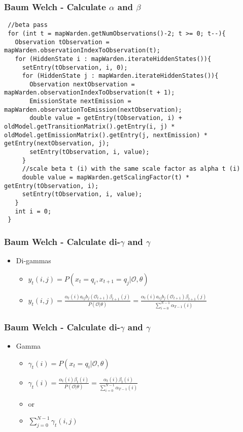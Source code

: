 \begin{frame}[fragile]
	\frametitle{Baum Welch - Calculate $\alpha$ and $\beta$}
	\begin{lstlisting}
 //beta pass
 for (int t = mapWarden.getNumObservations()-2; t >= 0; t--){
   Observation tObservation = mapWarden.observationIndexToObservation(t);
   for (HiddenState i : mapWarden.iterateHiddenStates()){
     setEntry(tObservation, i, 0);
     for (HiddenState j : mapWarden.iterateHiddenStates()){
       Observation nextObservation = mapWarden.observationIndexToObservation(t + 1);
       EmissionState nextEmission = mapWarden.observationToEmission(nextObservation);
       double value = getEntry(tObservation, i) + oldModel.getTransitionMatrix().getEntry(i, j) * oldModel.getEmissionMatrix().getEntry(j, nextEmission) * getEntry(nextObservation, j);
       setEntry(tObservation, i, value);
     }
     //scale beta t (i) with the same scale factor as alpha t (i)
     double value = mapWarden.getScalingFactor(t) * getEntry(tObservation, i);
     setEntry(tObservation, i, value);
   }
   int i = 0;
 }
	\end{lstlisting}
\end{frame}

\begin{frame}
	\frametitle{Baum Welch - Calculate di-$\gamma$ and $\gamma$}
	\begin{itemize}
		\item Di-gammas
		\begin{itemize}
			\item $y_t(i,j) = P(x_t = q_i, x_{t+1} = q_j | \mathcal{O},\theta)$
			\item $y_t(i,j) = \frac{\alpha_t(i) a_{ij} b_j (\mathcal{O}_{t+1})\beta_{t+1}(j)}{P(\mathcal{O} | \theta)} = \frac{\alpha_t(i) a_{ij} b_j (\mathcal{O}_{t+1})\beta_{t+1}(j)}{\sum\limits_{i=0}^{N-1} \alpha_{T-1}(i)}$
		\end{itemize}
	\end{itemize}
\end{frame}

\begin{frame}
	\frametitle{Baum Welch - Calculate di-$\gamma$ and $\gamma$}
	\begin{itemize}
		\item Gamma
		\begin{itemize}
			\item $\gamma_t(i) = P(x_t = q_i|\mathcal{O},\theta)$
			\item $\gamma_t(i) = \frac{\alpha_t(i)\beta_t(i)}{P(\mathcal{O}|\theta)} = \frac{\alpha_t(i)\beta_t(i)}{\sum\limits_{i=0}^{N-1} \alpha_{T-1}(i)}$
			\item or
			\item $ \sum\limits_{j=0}^{N-1} \gamma_t(i,j)$
		\end{itemize}
	\end{itemize}
\end{frame}

